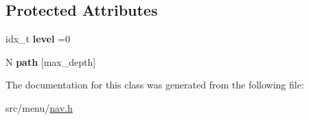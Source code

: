 \subsection*{Protected Attributes}
\begin{DoxyCompactItemize}
\item 
\mbox{\label{classNavTree_a27aac1d9c1e8950117be9cf1ddb651ea}} 
idx\+\_\+t {\bfseries level} =0
\item 
\mbox{\label{classNavTree_ac126ae570de8d578a4c908797fcf1af0}} 
N {\bfseries path} \mbox{[}max\+\_\+depth\mbox{]}
\end{DoxyCompactItemize}


The documentation for this class was generated from the following file\+:\begin{DoxyCompactItemize}
\item 
src/menu/\hyperlink{nav_8h}{nav.\+h}\end{DoxyCompactItemize}
